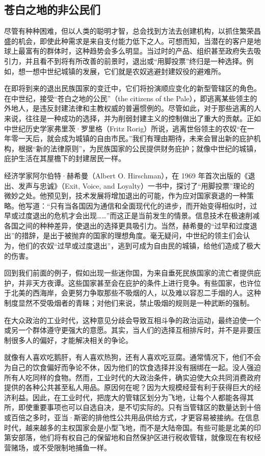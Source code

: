 \subsection{苍白之地的非公民们}
尽管有种种困难，但以人类的聪明才智，总会找到方法去创建机构，以抓住繁荣昌盛的机会，即使此种需求是来自支付能力低下之人。可想而知，当潜在的客户是地球上最富有的群体时，这种趋势会多么明显。当过时的产品、组织甚至政府失去吸引力，并且看不到将有所改善的前景时，退出或“用脚投票”终归是一种选择。例如，想一想中世纪城镇的发展，它们就是农奴逃避封建奴役的避难所。

在即将到来的退出民族国家的变迁中，它们将扮演顺应变化的新型管辖区的角色。在中世纪，接受“苍白之地的公民”（the citizens of the Pale），即逃离某些领主的外地人，是违反封建法律和主教权威的普遍惯例的。尽管如此，对于那些逃离的人来说，往往是一种成功的选择，并为削弱封建主义的控制做出了重大的贡献。正如中世纪历史学家弗里茨·罗里格（Fritz Rorig）所说，逃离世俗领主的农奴“在一年零一天后，就会成为城镇的自由市民。”我们有理由期待，未来会冒出新的庇护机构，根据“新的法律原则”，为民族国家的公民提供财务庇护；就像中世纪的城镇，庇护生活在其屋檐下的封建居民一样。

经济学家阿尔伯特·赫希曼（Albert O. Hirschman），在 1969 年首次出版的《退出、发声与忠诚》（Exit, Voice, and Loyalty）一书中，探讨了“用脚投票”理论的微妙之处。他预见到，技术发展将增加退出的可能，作为应对国家衰退的一种策略。他写道：“只有当各国因为通信和全面现代化的进步，而开始变得相似时，过早或过度退出的危机才会出现……”而这正是当前发生的情景。信息技术在极速削减各国之间的种种差异，使退出的选择更具吸引力。当然，赫希曼的“过早和过度退出”的措辞，是出于被抛弃的国家的理想角度。毫无疑问，中世纪的领主们会认为，他们的农奴“过早或过度退出”，逃到可成为自由民的城镇，给他们造成了极大的伤害。

回到我们前面的例子，假如出现一些迷你国，为来自垂死民族国家的流亡者提供庇护，并非天方夜谭。这些国家甚至会在庇护的条件上进行竞争。有些国家，也许位于北美的西海岸，会更努力争取那些不吸烟的人，以及难以容忍二手烟的人。这种制度显然不受吸烟者的青睐；对他们来说，禁止吸烟的规则是一种武断的强制。

在大众政治的工业时代，这种意见分歧会导致互相斗争的政治运动，最终迫使一个或另一个群体遵守更强大的意愿。其实，当人们的选择互相排斥时，并不是非要压制很多人的偏好，才能解决相关的争论。

就像有人喜欢吃鹅肝，有人喜欢热狗，还有人喜欢吃豆腐。通常情况下，他们不会为自己的饮食偏好而争论不休，因为他们的饮食选择并没有捆绑在一起。没人强迫所有人吃同样的食物。然而，工业时代的大政治条件，确实迫使大众共同消费政府提供的各种公共甚至私人用品。原因何在呢？因为大规模经营有利于获得巨大的经济利益。因此，在工业时代，把庞大的管辖区划分为飞地，让每个人都能各得其所，即使重要事项也可以自选自决，是不切实际的。只有当管辖区的数量达到十倍或百倍之多时，亚当·斯密的排他性公共用品供给方式，才更容易被接纳。在信息时代，越来越多的主权国家会是小型飞地，而不是大陆帝国。有些可能是北美的印第安部落，他们将有权自己的保留地和自然保护区进行税收管辖，就像现在有权经营赌场，或不受限制地捕鱼一样。

